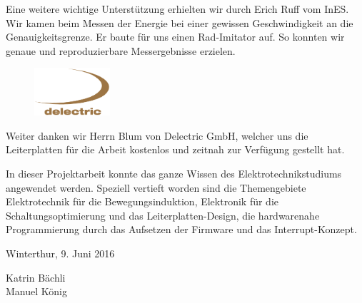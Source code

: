 Eine weitere wichtige Unterstützung erhielten wir durch Erich Ruff vom InES. Wir kamen beim Messen der Energie bei einer gewissen Geschwindigkeit an die Genauigkeitsgrenze. Er baute für uns einen Rad-Imitator auf. So konnten wir genaue und reproduzierbare Messergebnisse erzielen. 

\begin{figure}[ht]
   \includegraphics[width=0.25\textwidth]{0Vorspann/imag/delectric_logo_gross.png}
   \label{delectric_logo} 
\end{figure}

Weiter danken wir Herrn Blum von Delectric GmbH, welcher uns die Leiterplatten für die Arbeit kostenlos und zeitnah zur Verfügung gestellt hat.

In dieser Projektarbeit konnte das ganze Wissen des Elektrotechnikstudiums angewendet werden. Speziell vertieft worden sind die Themengebiete Elektrotechnik für die Bewegungsinduktion, Elektronik für die Schaltungsoptimierung und das Leiterplatten-Design, die hardwarenahe Programmierung durch das Aufsetzen der Firmware und das Interrupt-Konzept. 


Winterthur, 9. Juni 2016


Katrin Bächli\\
Manuel König





